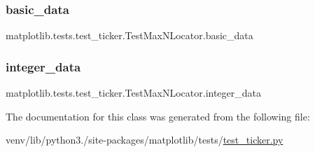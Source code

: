 \subsubsection{\texorpdfstring{basic\+\_\+data}{basic\_data}}
{\footnotesize\ttfamily matplotlib.\+tests.\+test\+\_\+ticker.\+Test\+Max\+N\+Locator.\+basic\+\_\+data\hspace{0.3cm}{\ttfamily [static]}}

\mbox{\label{classmatplotlib_1_1tests_1_1test__ticker_1_1TestMaxNLocator_a85cea85a8d16f96acf457c596a084fd1}} 
\subsubsection{\texorpdfstring{integer\+\_\+data}{integer\_data}}
{\footnotesize\ttfamily matplotlib.\+tests.\+test\+\_\+ticker.\+Test\+Max\+N\+Locator.\+integer\+\_\+data\hspace{0.3cm}{\ttfamily [static]}}



The documentation for this class was generated from the following file\+:\begin{DoxyCompactItemize}
\item 
venv/lib/python3./site-\/packages/matplotlib/tests/\hyperlink{test__ticker_8py}{test\+\_\+ticker.\+py}\end{DoxyCompactItemize}
